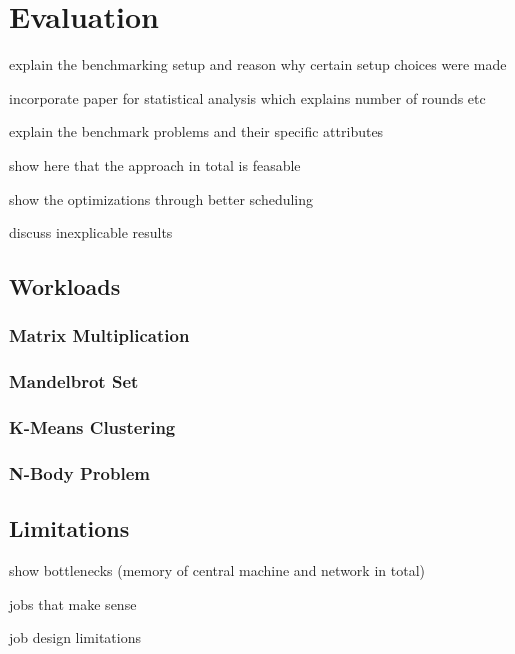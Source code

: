 \chapter{Evaluation}



explain the benchmarking setup and reason why certain setup choices were made

incorporate paper for statistical analysis which explains number of rounds etc

explain the benchmark problems and their specific attributes

show here that the approach in total is feasable

show the optimizations through better scheduling

discuss inexplicable results


\section{Workloads}

\subsection*{Matrix Multiplication}

\subsection*{Mandelbrot Set}

\subsection*{K-Means Clustering}

\subsection*{N-Body Problem}

\section{Limitations}

show bottlenecks (memory of central machine and network in total)

jobs that make sense

job design limitations